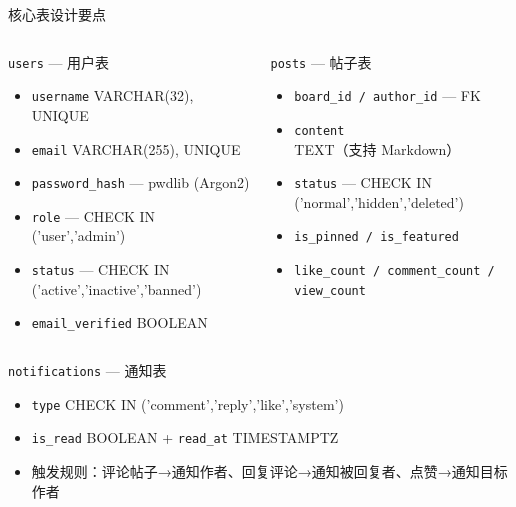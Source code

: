 \documentclass[aspectratio=169,UTF8]{ctexbeamer}
\begin{document}
\begin{frame}{核心表设计要点}
    \begin{columns}[T]
        \begin{block}{\texttt{users} — 用户表}
            \begin{itemize}
                \item \texttt{username} VARCHAR(32), UNIQUE
                \item \texttt{email} VARCHAR(255), UNIQUE
                \item \texttt{password\_hash} — pwdlib (Argon2)
                \item \texttt{role} — CHECK IN ('user','admin')
                \item \texttt{status} — CHECK IN ('active','inactive','banned')
                \item \texttt{email\_verified} BOOLEAN
            \end{itemize}
        \end{block}
        \begin{block}{\texttt{posts} — 帖子表}
            \begin{itemize}
                \item \texttt{board\_id / author\_id} — FK
                \item \texttt{content} TEXT（支持 Markdown）
                \item \texttt{status} — CHECK IN ('normal','hidden','deleted')
                \item \texttt{is\_pinned / is\_featured}
                \item \texttt{like\_count / comment\_count / view\_count}
            \end{itemize}
        \end{block}
    \end{columns}
    \vspace{0.2cm}
    \begin{block}{\texttt{notifications} — 通知表}
        \begin{itemize}
            \item \texttt{type} CHECK IN ('comment','reply','like','system')
            \item \texttt{is\_read} BOOLEAN + \texttt{read\_at} TIMESTAMPTZ
            \item 触发规则：评论帖子→通知作者、回复评论→通知被回复者、点赞→通知目标作者
        \end{itemize}
    \end{block}
\end{frame}
\end{document}
